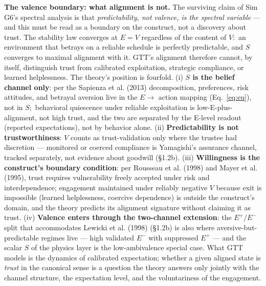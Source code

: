 \documentclass[11pt,twocolumn]{article}
\theoremstyle{gttdef}
\theoremstyle{gttplain}
\begin{document}
\textbf{The valence boundary: what alignment is not.} The surviving claim of Sim G6's spectral analysis is that \emph{predictability, not valence, is the spectral variable} --- and this must be read as a boundary on the construct, not a discovery about trust. The stability law converges at $E = V$ regardless of the content of $V:$ an environment that betrays on a reliable schedule is perfectly predictable, and $S$ converges to maximal alignment with it. GTT's alignment therefore cannot, by itself, distinguish trust from calibrated exploitation, strategic compliance, or learned helplessness. The theory's position is fourfold. (i) \textbf{$S$ is the belief channel only}: per the Sapienza et al. (2013) decomposition, preferences, risk attitudes, and betrayal aversion live in the $E\to$ action mapping (Eq.~\eqref{eq:eu}), not in $S;$ behavioral quiescence under reliable exploitation is low-E-plus-alignment, not high trust, and the two are separated by the E-level readout (reported expectations), not by behavior alone. (ii) \textbf{Predictability is not trustworthiness}: $V$ counts as trust-validation only where the trustee had discretion --- monitored or coerced compliance is Yamagishi's assurance channel, tracked separately, not evidence about goodwill (\S{}1.2b). (iii) \textbf{Willingness is the construct's boundary condition}: per Rousseau et al. (1998) and Mayer et al. (1995), trust requires vulnerability freely accepted under risk and interdependence; engagement maintained under reliably negative $V$ because exit is impossible (learned helplessness, coercive dependence) is outside the construct's domain, and the theory predicts its alignment signature without claiming it as trust. (iv) \textbf{Valence enters through the two-channel extension}: the $E^{+}/E^{-}$ split that accommodates Lewicki et al. (1998) (\S{}1.2b) is also where aversive-but-predictable regimes live --- high validated $E^{-}$ with suppressed $E^{+}$ --- and the scalar $S$ of the physics layer is the low-ambivalence special case. What GTT models is the dynamics of calibrated expectation; whether a given aligned state is \emph{trust} in the canonical sense is a question the theory answers only jointly with the channel structure, the expectation level, and the voluntariness of the engagement.
\end{document}
